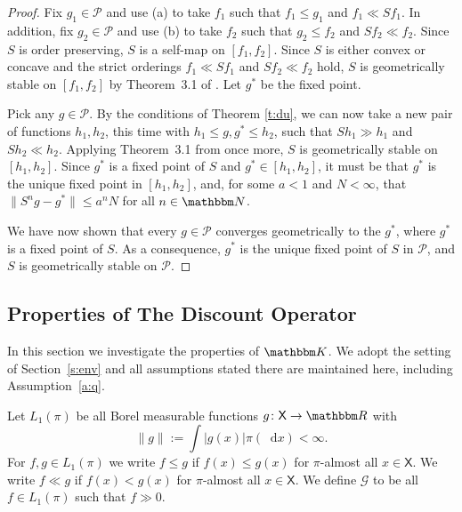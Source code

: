 \documentclass[12pt, reqno]{amsart}
\renewcommand{\leq}{\leqslant}
\newcommand{\1}{\mathbbm 1}
\newcommand*\diff{\mathop{}\!\mathrm{d}}
\newcommand{\gG}{\mathscr G}
\newcommand{\pP}{\mathcal P}
\newcommand{\RR}{\mathbbm R}
\newcommand{\NN}{\mathbbm N}
\newcommand{\KK}{\mathbbm K}
\newcommand{\XX}{\mathsf X}
\theoremstyle{plain}
\theoremstyle{definition}
\begin{document}
\begin{proof}
    Fix $g_1 \in \pP$ and use (a) to take $f_1$ such that $f_1 \leq g_1$ and
    $f_1 \ll Sf_1$.  In addition, fix $g_2 \in
    \pP$ and use (b) to take $f_2$ such that $g_2 \leq f_2$ and $Sf_2 \ll f_2$. Since $S$ is order preserving, $S$ is a self-map on $[f_1,
    f_2]$.  Since $S$ is either convex or concave and the strict orderings
    $f_1 \ll Sf_1$ and $Sf_2 \ll f_2$ hold, $S$ is geometrically stable on
    $[f_1, f_2]$ by Theorem~3.1 of \cite{du1990fixed}.  Let $g^*$ be the fixed
    point.

    Pick any $g \in \pP$.  By the conditions of Theorem \ref{t:du}, we can now take a new
    pair of functions $h_1, h_2$, this time with $h_1 \leq g, g^* \leq h_2$,
    such that $Sh_1 \gg h_1$ and $Sh_2 \ll h_2$.  Applying Theorem~3.1
    from \cite{du1990fixed} once more, $S$ is geometrically stable on $[h_1,
    h_2]$.  Since $g^*$ is a fixed point of $S$ and $g^* \in [h_1, h_2]$, it
    must be that $g^*$ is the unique fixed point in $[h_1, h_2]$, and, for
    some $a <1$ and $N < \infty$, that $\| S^n g - g^*\| \leq a^n N$ for all $n \in \NN$.

    We have now shown that every $g \in \pP$ converges geometrically to the
    $g^*$, where $g^*$ is a fixed point of $S$.  As a consequence, $g^*$ is the unique fixed point of
    $S$ in $\pP$, and $S$ is geometrically stable on $\pP$.
\end{proof}





\subsection{Properties of The Discount Operator}

In this section we investigate the properties of $\KK$.  We adopt the setting of
Section~\ref{s:env} and all assumptions stated there are maintained here,
including Assumption~\ref{a:q}. 

Let $L_1(\pi)$ be all Borel measurable functions $g \colon \XX \to \RR$ with
%
\begin{equation*}
    \| g \| := \int |g(x)| \pi(\diff x) < \infty.
\end{equation*}
%
For $f, g \in L_1(\pi)$ we write $f \leq g$
if $f(x) \leq g(x)$ for $\pi$-almost all $x \in \XX$.  We write $f \ll g$ if
$f(x) < g(x)$ for $\pi$-almost all $x \in \XX$.  We define $\gG$ to be all $f
\in L_1(\pi)$ such that $f \gg 0$.
\end{document}
